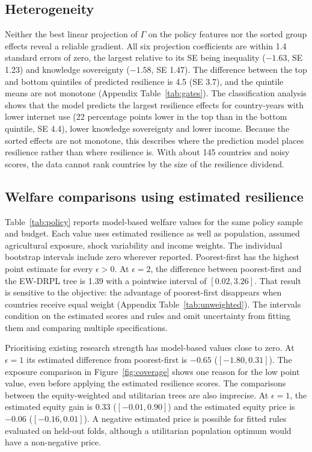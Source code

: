 \subsection{Heterogeneity}

Neither the best linear projection of $\Gamma$ on the policy features nor the sorted group effects
reveal a reliable gradient. All six projection coefficients are within 1.4 standard errors of zero,
the largest relative to its SE being inequality ($-1.63$, SE 1.23) and knowledge sovereignty
($-1.58$, SE 1.47). The difference between the top and bottom quintiles of predicted resilience is
4.5 (SE 3.7), and the quintile means are not monotone (Appendix Table~\ref{tab:gates}). The
classification analysis shows that the model predicts the largest resilience effects for
country-years with lower internet use (22 percentage points lower in the top than in the bottom
quintile, SE 4.4), lower knowledge sovereignty and lower income. Because the sorted effects are not
monotone, this describes where the prediction model places resilience rather than where resilience
is. With about 145 countries and noisy scores, the data cannot rank countries by the size of the
resilience dividend.

\subsection{Welfare comparisons using estimated resilience}

Table~\ref{tab:policy} reports model-based welfare values for the same policy sample
and budget. Each value uses estimated resilience as well as population, assumed
agricultural exposure, shock variability and income weights. The individual bootstrap
intervals include zero wherever reported. Poorest-first has the highest point estimate
for every $\epsilon>0$. At $\epsilon=2$, the difference between poorest-first and the
EW-DRPL tree is 1.39 with a pointwise interval of $[0.02,3.26]$. That result is sensitive
to the objective: the advantage of poorest-first disappears when countries receive
equal weight (Appendix Table~\ref{tab:unweighted}). The intervals condition on the
estimated scores and rules and omit uncertainty from fitting them and comparing
multiple specifications.

Prioritising existing research strength has model-based values close to zero.
At $\epsilon=1$ its estimated difference from poorest-first is $-0.65$
($[-1.80,0.31]$). The exposure comparison in Figure~\ref{fig:coverage} shows one
reason for the low point value, even before applying the estimated resilience
scores. The comparisons between the equity-weighted and utilitarian trees are also
imprecise. At $\epsilon=1$, the estimated equity gain is 0.33 ($[-0.01,0.90]$)
and the estimated equity price is $-0.06$ ($[-0.16,0.01]$). A negative estimated
price is possible for fitted rules evaluated on held-out folds, although a
utilitarian population optimum would have a non-negative price.

